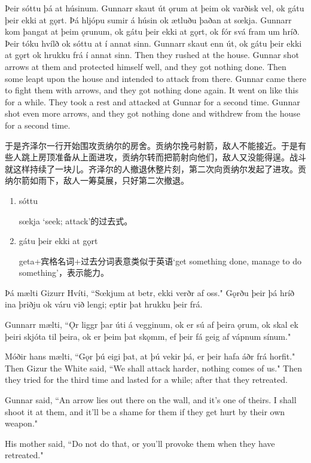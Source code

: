 \begin{paracol}{2}
    Þeir sóttu þá at húsinum. Gunnarr skaut út ǫrum at þeim ok varðisk vel, ok gátu þeir ekki at gǫrt. Þá hljópu sumir á húsin ok ætluðu þaðan at sœkja. Gunnarr kom þangat at þeim ǫrunum, ok gátu þeir ekki at gǫrt, ok fór svá fram um hríð. Þeir tóku hvílð ok sóttu at í annat sinn. Gunnarr skaut enn út, ok gátu þeir ekki at gǫrt ok hrukku frá í annat sinn.
    \switchcolumn
    Then they rushed at the house. Gunnar shot arrows at them and protected himself well, and they got nothing done. Then some leapt upon the house and intended to attack from there. Gunnar came there to fight them with arrows, and they got nothing done again. It went on like this for a while. They took a rest and attacked at Gunnar for a second time. Gunnar shot even more arrows, and they got nothing done and withdrew from the house for a second time.
\end{paracol}
\begin{translation*}{}
    于是齐泽尔一行开始围攻贡纳尔的房舍。贡纳尔挽弓射箭，敌人不能接近。于是有些人跳上房顶准备从上面进攻，贡纳尔转而把箭射向他们，敌人又没能得逞。战斗就这样持续了一块儿。齐泽尔的人撤退休整片刻，第二次向贡纳尔发起了进攻。贡纳尔箭如雨下，敌人一筹莫展，只好第二次撤退。
\end{translation*}
\begin{grammar*}{}
    \begin{enumerate}[leftmargin=*]
        \item sóttu

              sœkja `seek; attack'的过去式。

        \item gátu þeir ekki at gǫrt

              geta+宾格名词+过去分词表意类似于英语`get something done, manage to do something'，表示能力。
    \end{enumerate}
\end{grammar*}
\begin{paracol}{2}
    Þá mælti Gizurr Hvíti, ``Sœkjum at betr, ekki verðr af oss." Gǫrðu þeir þá hríð ina þriðju ok váru við lengi; eptir þat hrukku þeir frá.

    Gunnarr mælti, ``Ǫr liggr þar úti á vegginum, ok er sú af þeira ǫrum, ok skal ek þeiri skjóta til þeira, ok er þeim þat skǫmm, ef þeir fá geig af vápnum sínum."

    Móðir hans mælti, ``Gǫr þú eigi þat, at þú vekir þá, er þeir hafa áðr frá horfit."
    \switchcolumn
    Then Gizur the White said, ``We shall attack harder, nothing comes of us." Then they tried for the third time and lasted for a while; after that they retreated.

    Gunnar said, ``An arrow lies out there on the wall, and it's one of theirs. I shall shoot it at them, and it'll be a shame for them if they get hurt by their own weapon."

    His mother said, ``Do not do that, or you'll provoke them when they have retreated."
\end{paracol}
